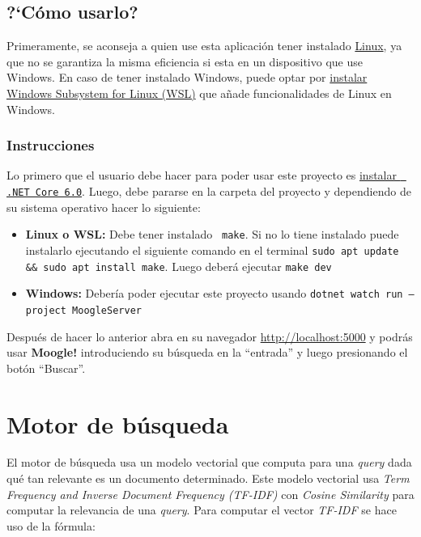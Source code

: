 \documentclass[a4paper, 12pt]{report}
\begin{document}
\subsection*{?`C\'omo usarlo?}

Primeramente, se aconseja a quien use esta aplicaci\'on tener instalado
\href{https://es.wikipedia.org/wiki/Linux}{Linux}, ya que no se garantiza la
misma eficiencia si esta en un dispositivo que use Windows. En caso de tener
instalado Windows, puede optar por
\href{https://learn.microsoft.com/es-es/windows/wsl/install}{instalar Windows
	Subsystem for Linux (WSL)} que a\~nade funcionalidades de Linux en Windows.

\subsubsection*{Instrucciones}

Lo primero que el usuario debe hacer para poder usar este proyecto es
\href{https://learn.microsoft.com/es-es/dotnet/core/install/}{instalar {\tt
			\color{gray45}.NET Core 6.0}}. Luego, debe pararse en la carpeta del proyecto y
dependiendo de su sistema operativo hacer lo siguiente:

\begin{itemize}
	\item {\bf Linux o WSL:} Debe tener instalado {\tt \color{gray45} make}. Si no lo tiene instalado
	      puede instalarlo ejecutando el siguiente comando en el terminal {\tt \color{gray45}sudo apt update \&\& sudo apt install make}. Luego deber\'a ejecutar {\tt \color{gray45}make dev}

	\item {\bf Windows:} Debería poder ejecutar este proyecto usando {\tt \color{gray45}dotnet watch run --project MoogleServer}
\end{itemize}

Despu\'es de hacer lo anterior abra en su navegador
\href{http://localhost:5000}{http://localhost:5000} y podr\'as usar {\bf
		Moogle!} introduciendo su b\'usqueda en la ``entrada'' y luego presionando el
bot\'on ``Buscar''.

\section*{Motor de b\'usqueda}

El motor de búsqueda usa un modelo vectorial que computa para una {\it query}
dada qué tan relevante es un documento determinado. Este modelo vectorial usa
	{\it Term Frequency and Inverse Document Frequency (TF-IDF)} con {\it Cosine
		Similarity} para computar la relevancia de una {\it query}. Para computar el vector {\it TF-IDF}
se hace uso de la fórmula:
\end{document}
